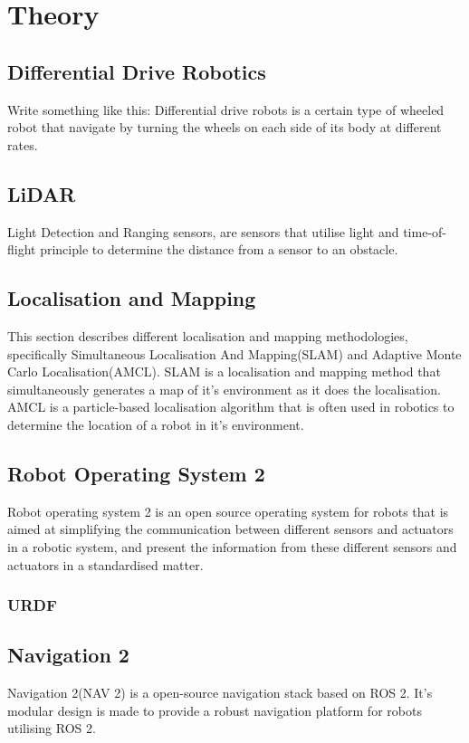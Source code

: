 \chapter{Theory}

\section{Differential Drive Robotics}
Write something like this:
Differential drive robots is a certain type of wheeled robot that navigate by turning the wheels on each side of its body at different rates.

\section{LiDAR}
Light Detection and Ranging sensors, are sensors that utilise light and time-of-flight principle to determine the distance from a sensor to an obstacle. 

\section{Localisation and Mapping}
This section describes different localisation and mapping methodologies, specifically Simultaneous Localisation And Mapping(SLAM) and Adaptive Monte Carlo Localisation(AMCL). SLAM is a localisation and mapping method that simultaneously generates a map of it's environment as it does the localisation. AMCL is a particle-based localisation algorithm that is often used in robotics to determine the location of a robot in it's environment.

\section{Robot Operating System 2}
Robot operating system 2 is an open source operating system for robots that is aimed at simplifying the communication between different sensors and actuators in a robotic system, and present the information from these different sensors and actuators in a standardised matter.

\subsection{URDF}


\section{Navigation 2}
Navigation 2(NAV 2) is a open-source navigation stack based on ROS 2. It's modular design is made to provide a robust navigation platform for robots utilising ROS 2.

